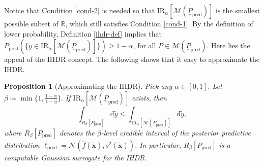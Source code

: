 \documentclass[12pt, english, oneside, a4paper]{article}
\newtheorem{proposition}[theorem]{Proposition}
\newcommand{\x}{\boldsymbol{x}}
\begin{document}
Notice that Condition \ref{cond-2} is needed so that $\text{IR}_\alpha[\mathcal{M}(\underline{P}_\text{pred})]$ is the smallest possible subset of $\mathbb{R}$, which still satisfies Condition \ref{cond-1}. By the definition of lower probability, 
Definition \ref{ihdr-def} implies that $P_\text{pred}( \{\tilde{y}\in \text{IR}_\alpha[\mathcal{M}(\underline{P}_\text{pred})]\})\geq 1-\alpha$, for all ${P}\in\mathcal{M}(\underline{P}_\text{pred})$. Here lies the appeal of the IHDR concept. The following shows that it easy to approximate the IHDR.


\begin{proposition}[Approximating the IHDR]\label{char-ihdr}
    Pick any $\alpha \in [0,1]$.
    Let
    \(
    \beta\coloneqq \min\{1,\frac{1-\alpha}{1-\eta}\}.
    \)
    If $\text{IR}_\alpha[\mathcal{M}(\underline{P}_\text{pred})]$ exists, then
    \[
    \int_{R_\beta[P_\text{pred}]} \mathrm{d}\tilde{y}
    \le
    \int_{\text{IR}_\alpha[\mathcal{M}(\underline{P}_\text{pred})]} \mathrm{d}\tilde{y},
    \]
    where $R_\beta[P_\text{pred}]$ denotes the $\beta$-level credible interval of the posterior predictive distribution $\ell_\text{pred}=\mathcal{N}(\hat{f}(\tilde{\x}),s^2(\tilde{\x}))$.
    In particular, $R_\beta[P_\text{pred}]$ is a computable Gaussian surrogate for the IHDR.
\end{proposition}
\end{document}
